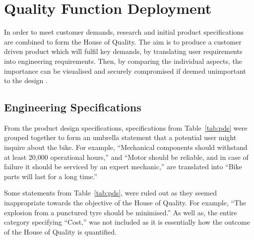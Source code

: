\documentclass[a4paper,11pt]{article}
\begin{document}
\section{Quality Function Deployment}

In order to meet customer demands, research and initial product specifications are combined to form the House of Quality. The aim is to produce a customer driven product which will fulfil key demands, by translating user requirements into engineering requirements. Then, by comparing the individual aspects, the importance can be visualised and securely compromised if deemed unimportant to the design \cite{fran01}.

\subsection{Engineering Specifications}

From the product design specifications, specifications from Table~\ref{tab:pds} were grouped together to form an umbrella statement that a potential user might inquire about the bike. For example, ``Mechanical components should withstand at least 20,000 operational hours,'' and ``Motor should be reliable, and in case of failure it should be serviced by an expert mechanic,'' are translated into ``Bike parts will last for a long time.'' 

Some statements from Table~\ref{tab:pds}, were ruled out as they seemed inappropriate towards the objective of the House of Quality. For example, ``The explosion from a punctured tyre should be minimised.'' As well as, the entire category specifying ``Cost,'' was not included as it is essentially how the outcome of the House of Quality is quantified.
\end{document}
